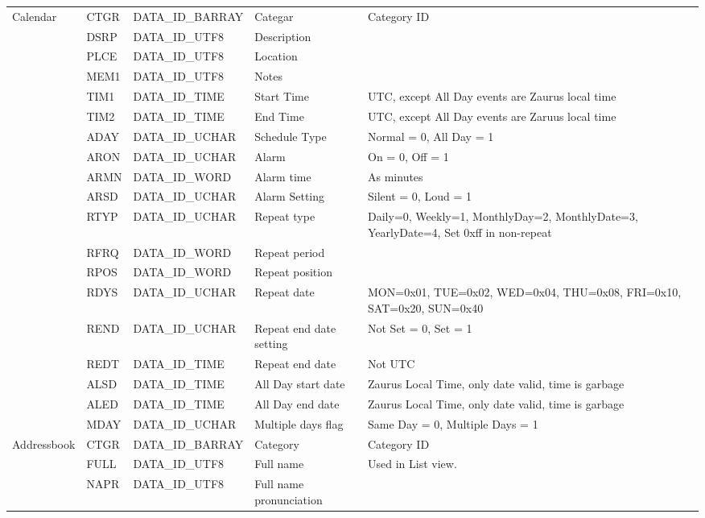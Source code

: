 \begin{longtable}[c]{|l|l|l|p{3cm}|p{5cm}|}
        Calendar & CTGR & DATA\_ID\_BARRAY & Categar & Category ID \\
        & DSRP & DATA\_ID\_UTF8 & Description & \\
        & PLCE & DATA\_ID\_UTF8 & Location & \\
        & MEM1 & DATA\_ID\_UTF8 & Notes & \\
        & TIM1 & DATA\_ID\_TIME & Start Time & UTC, except All Day events are
        Zaurus local time \\
        & TIM2 & DATA\_ID\_TIME & End Time & UTC, except All Day events are
        Zaruus local time \\
        & ADAY & DATA\_ID\_UCHAR & Schedule Type & Normal = 0, All Day = 1 \\
        & ARON & DATA\_ID\_UCHAR & Alarm & On = 0, Off = 1 \\
        & ARMN & DATA\_ID\_WORD & Alarm time & As minutes \\
        & ARSD & DATA\_ID\_UCHAR & Alarm Setting & Silent = 0, Loud = 1 \\
        & RTYP & DATA\_ID\_UCHAR & Repeat type & Daily=0, Weekly=1,
        MonthlyDay=2, MonthlyDate=3, YearlyDate=4, Set 0xff in non-repeat \\
        & RFRQ & DATA\_ID\_WORD & Repeat period & \\
        & RPOS & DATA\_ID\_WORD & Repeat position & \\
        & RDYS & DATA\_ID\_UCHAR & Repeat date & MON=0x01, TUE=0x02, WED=0x04,
        THU=0x08, FRI=0x10, SAT=0x20, SUN=0x40 \\        
        & REND & DATA\_ID\_UCHAR & Repeat end date setting & Not Set = 0,
        Set = 1 \\
        & REDT & DATA\_ID\_TIME & Repeat end date & Not UTC \\
        & ALSD & DATA\_ID\_TIME & All Day start date & Zaurus Local Time, only
        date valid, time is garbage \\
        & ALED & DATA\_ID\_TIME & All Day end date & Zaurus Local Time, only
        date valid, time is garbage \\
        & MDAY & DATA\_ID\_UCHAR & Multiple days flag & Same Day = 0, Multiple
        Days = 1 \\
        \hline
        Addressbook & CTGR & DATA\_ID\_BARRAY & Category & Category ID \\
        & FULL & DATA\_ID\_UTF8 & Full name & Used in List view. \\
        & NAPR & DATA\_ID\_UTF8 & Full name pronunciation & \\

\end{longtable}
